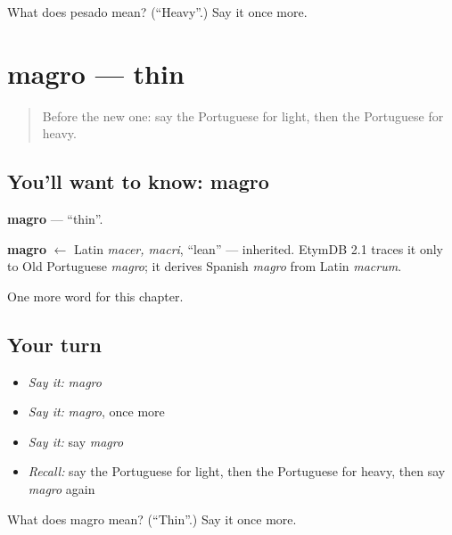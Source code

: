 \begin{tcolorbox}[breakable,colback=teal!4,colframe=teal!35!black,title={Before you move on}]
What does pesado mean? (\textquotedblleft{}Heavy\textquotedblright{}.) Say it once more.
\end{tcolorbox}
\section[magro]{magro — thin}

\label{lesson:PT-C128-magro}



\begin{quote}
Before the new one: say the Portuguese for light, then the Portuguese for heavy.
\end{quote}

\subsection*{You'll want to know: magro}
\textbf{magro} — \textquotedblleft{}thin\textquotedblright{}.

\begin{cousinweb}
\textbf{magro} $\leftarrow$ Latin \emph{macer, macri}, \textquotedblleft{}lean\textquotedblright{} — inherited. EtymDB 2.1 traces it only to Old Portuguese \emph{magro}; it derives Spanish \emph{magro} from Latin \emph{macrum}.
\end{cousinweb}

\begin{grammarlens}[title={What you've built}]
One more word for this chapter.
\end{grammarlens}

\subsection*{Your turn}
\begin{itemize}
\raggedright
  \item \emph{Say it:} \emph{magro}
  \item \emph{Say it:} \emph{magro}, once more
  \item \emph{Say it:} say \emph{magro}
  \item \emph{Recall:} say the Portuguese for light, then the Portuguese for heavy, then say \emph{magro} again
\end{itemize}

\begin{tcolorbox}[breakable,colback=teal!4,colframe=teal!35!black,title={Before you move on}]
What does magro mean? (\textquotedblleft{}Thin\textquotedblright{}.) Say it once more.
\end{tcolorbox}
